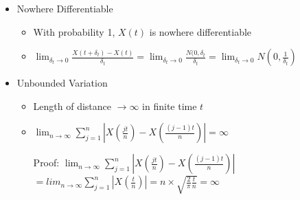 \documentclass[a4paper]{article}
\begin{document}
\begin{itemize}
\begin{itemize}
\begin{itemize}
                \end{itemize}
            \item Nowhere Differentiable
                \begin{itemize}
                    \item With probability 1, $X(t)$ is nowhere differentiable
                    \item $\lim_{\delta_t \rightarrow 0} \frac{X(t+\delta_t) - X(t)}{\delta_t} = \lim_{\delta_t \rightarrow 0} \frac{N(0, \delta_t}{\delta_t} = \lim_{\delta_t \rightarrow 0} N(0, \frac{1}{\delta_t})$
                \end{itemize}
            \item Unbounded Variation
                \begin{itemize}
                    \item Length of distance $\rightarrow \infty$ in finite time $t$
                    \item $\lim_{n \rightarrow \infty} \sum_{j=1}^n |X(\frac{jt}{n}) - X(\frac{(j-1)t}{n})| = \infty$

                        Proof: $\lim_{n \rightarrow \infty} \sum_{j=1}^n |X(\frac{jt}{n}) - X(\frac{(j-1)t}{n})|$
                        $= lim_{n \rightarrow \infty} \sum_{j=1}^n |X(\frac{t}{n})| = n \times \sqrt{\frac{2}{\pi} \frac{t}{n}} = \infty$
                \end{itemize}
        \end{itemize}
\end{itemize}
\end{document}
